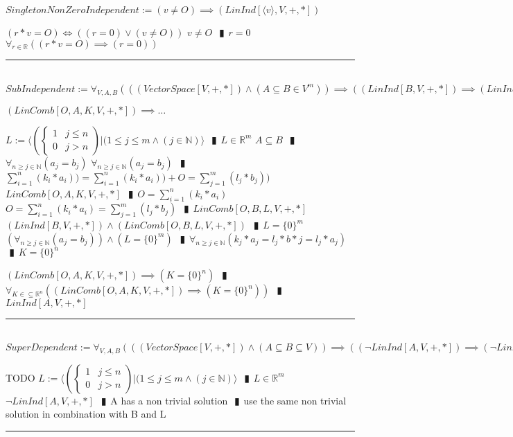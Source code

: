 \documentclass{book}
\newcommand{\abr}{:=}
\newcommand{\pipe}{$\phantom{(}\vrectangleblack\phantom{)}$}
\begin{document}
$SingletonNonZeroIndependent \abr (v \neq O) \implies (LinInd[\langle v \rangle, V, +, *])$
\begin{enumerate}
  \lit $(r * v = O) \iff ((r = 0) \lor (v \neq O))$
  \lit $v \neq O$ \pipe $r = 0$
  \lit $\forall_{r \in \mathbb{R}}((r * v = O) \implies (r = 0))$
\end{enumerate} \vspace{.75mm} \hrule \vspace{.75mm} \ \\ 

$SubIndependent \abr \forall_{V, A, B}(((VectorSpace[V, +, *]) \land (A \subseteq B \in V^m)) \implies ((LinInd[B, V, +, *]) \implies (LinInd[A, V, +, *])))$
\begin{enumerate}
  \lit $(LinComb[O, A, K, V, +, *]) \implies \ldots$
  \begin{enumerate}
    \lit $L \abr \langle \left(\begin{cases} 
      1 & j \leq n \\
      0 & j > n 
    \end{cases}\right) | (1 \leq j \leq m \land (j \in \mathbb{N}) \rangle$ \pipe $L \in \mathbb{R}^m$
    \lit $A \subseteq B$ \pipe $\forall_{n \geq j \in \mathbb{N}}(a_j = b_j)$
    \lit $\forall_{n \geq j \in \mathbb{N}}(a_j = b_j)$ \pipe $\sum_{i = 1}^{n}(k_i * a_i)) = \sum_{i = 1}^{n}(k_i * a_i)) + O = \sum_{j = 1}^{m}(l_j * b_j))$
    \lit $LinComb[O, A, K, V, +, *]$ \pipe $O = \sum_{i = 1}^{n}(k_i * a_i)$
    \lit $O = \sum_{i = 1}^{n}(k_i * a_i) = \sum_{j = 1}^{m}(l_j * b_j)$ \pipe $LinComb[O, B, L, V, +, *]$
    \lit $(LinInd[B, V, +, *]) \land (LinComb[O, B, L, V, +, *])$ \pipe $L = \{0\}^m$ 
    \lit $(\forall_{n \geq j \in \mathbb{N}}(a_j = b_j)) \land (L = \{0\}^m)$ \pipe $\forall_{n \geq j \in \mathbb{N}}(k_j * a_j = l_j * b*j = l_j * a_j)$ \pipe $K = \{0\}^n$
  \end{enumerate}
  \lit $(LinComb[O, A, K, V, +, *]) \implies (K = \{0\}^n)$ \pipe $\forall_{K \in \subseteq \mathbb{R}^n}((LinComb[O, A, K, V, +, *]) \implies (K = \{0\}^n))$ \pipe $LinInd[A, V, +, *]$
\end{enumerate} \vspace{.75mm} \hrule \vspace{.75mm} \ \\ 

$SuperDependent \abr \forall_{V, A, B}(((VectorSpace[V, +, *]) \land (A \subseteq B \subseteq V)) \implies ((\lnot LinInd[A, V, +, *]) \implies (\lnot LinInd[B, V, +, *])))$
\begin{enumerate}
  \lit TODO
  \lit $L \abr \langle \left(\begin{cases} 
      1 & j \leq n \\
      0 & j > n 
    \end{cases}\right) | (1 \leq j \leq m \land (j \in \mathbb{N}) \rangle$ \pipe $L \in \mathbb{R}^m$
  \lit $\lnot LinInd[A, V, +, *]$ \pipe A has a non trivial solution \pipe use  the same non trivial solution in combination with B and L
\end{enumerate} \vspace{.75mm} \hrule \vspace{.75mm} \ \\ 
\end{document}
